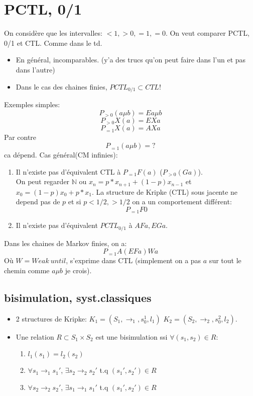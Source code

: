 \documentclass[12pt]{article}
\theoremstyle{plain}
\theoremstyle{definition}
\theoremstyle{remark}
\newcommand{\N}{\mathbb{N}}
\begin{document}
\section{PCTL, 0/1}

On considère que les intervalles: $<1,>0, =1,=0$.
On veut comparer PCTL, 0/1 et CTL. Comme dans le td.
\begin{itemize}
    \item En général, incomparables. (y'a des trucs qu'on 
    peut faire dans l'un et pas dans l'autre)
    \item Dans le cas des chaines finies, $PCTL_{0/1}\subset 
    CTL$!
\end{itemize}
Exemples simples: \[
    P_{>0}(a\mu b)=Ea\mu b\]
    \[P_{>0}X(a)=EXa\]
    \[P_{=1}X(a)=AXa
\]
Par contre
\[
    P_{=1}(a\mu b)=?
\]
ca dépend. Cas général(CM infinies):
\begin{enumerate}
    \item Il n'existe pas d'équivalent CTL à $P_{=1}F(a)$
    ($P_{>0}(Ga)$).\\
On peut regarder $\N$ ou $x_n=p*x_{n+1}+(1-p)x_{n-1}$ 
et $x_0=(1-p)x_0+p*x_1$. La structure de Kripke (CTL)
sous jacente ne depend pas de $p$ et si $p<1/2,>1/2$ 
on a un comportement différent: 
\[
    P_{=1}F0
\]
    \item Il n'existe pas d'équivalent $PCTL_{0/1}$ 
    à $AFa,EGa$. 
\end{enumerate}

Dans les chaines de Markov finies, on a:
\[
    P_{=1}A(EFa)Wa
    \]
Où $W=Weak~until$, s'exprime dans CTL (simplement 
on a pas $a$ sur tout le chemin comme $a\mu b$ je crois).

\subsection{bisimulation, syst.classiques}
\begin{itemize}
    \item 2 structures de Kripke: $K_1=(S_1, \to_1, s_0^1, l_1)$
    $K_2=(S_2, \to_2, s_0^2, l_2)$.
    \item Une relation $R\subset S_1\times S_2$ est une 
    bisimulation ssi $\forall(s_1,s_2)\in R$:
    \begin{enumerate}
        \item $l_1(s_1)=l_2(s_2)$
        \item $\forall s_1\to_1 s_1'$, $\exists s_2\to_2 s_2'$ t.q
        $(s_1',s_2')\in R$
        \item $\forall s_2\to_2 s_2'$, $\exists s_1\to_1 s_1'$ t.q
        $(s_1',s_2')\in R$
    \end{enumerate}
\end{itemize}
\end{document}
